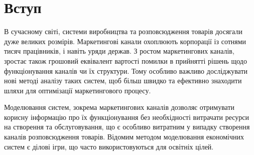 \section*{Вступ}

В сучасному світі, системи виробництва та розповсюдження товарів досягали дуже великих розмірів. Маркетингові канали охоплюють корпорації із сотнями тисяч працівників, і навіть уряди держав. З ростом маркетингових каналів, зростає також грошовий еквівалент вартості помилки в прийнятті рішень щодо функціонування каналів чи їх структури. Тому особливо важливо досліджувати нові методі аналізу таких систем, щоб більш швидко та ефективно знаходити шляхи для оптимізації маркетингового процесу. 

Моделювання систем, зокрема маркетингових каналів дозволяє отримувати корисну інформацію про їх функціонування без необхідності витрачати ресурси на створення та обслуговування, що є особливо витратним у випадку створення каналів розповсюдження товарів. Відомим методом моделювання економічних систем є ділові ігри, що часто використовуються для освітніх цілей.

